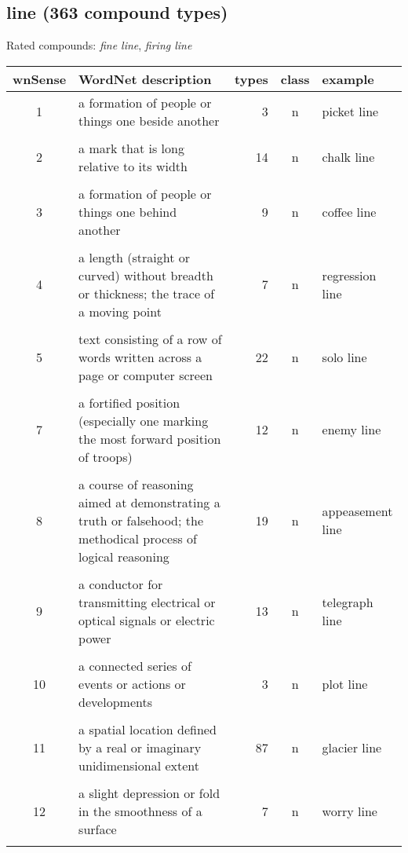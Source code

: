 \pagebreak[4]
\subsection{line      (363 compound types)}
\vspace*{-.2cm}
Rated compounds: \emph{fine line}, \emph{firing line}

\vspace*{-.4cm}

\noindent
\begin{longtable}{c>{\raggedright\arraybackslash}p{5cm}rc>{\raggedright\arraybackslash}p{2cm}}\lsptoprule
{\small wnSense}&WordNet description&types&class&example\\\midrule
1&a formation of people or things one beside another&3&n&picket line\\\\[-.7em]
2&a mark that is long relative to its width&14&n&chalk line\\\\[-.7em]
3&a formation of people or things one behind another&9&n&coffee line\\\\[-.7em]
4&a length (straight or curved) without breadth or thickness; the trace of a moving point&7&n&regression line\\\\[-.7em]
5&text consisting of a row of words written across a page or computer screen&22&n&solo line\\\\[-.7em]
7&a fortified position (especially one marking the most forward position of troops)&12&n&enemy line\\\\[-.7em]
8&a course of reasoning aimed at demonstrating a truth or falsehood; the methodical process of logical reasoning&19&n&ap\-pease\-ment line\\\\[-.7em]
9&a conductor for transmitting electrical or optical signals or electric power&13&n&telegraph line\\\\[-.7em]
10&a connected series of events or actions or developments&3&n&plot line\\\\[-.7em]
11&a spatial location defined by a real or imaginary unidimensional extent&87&n&glacier line\\\\[-.7em]
12&a slight depression or fold in the smoothness of a surface&7&n&worry line\\\\[-.7em]

\end{longtable}
